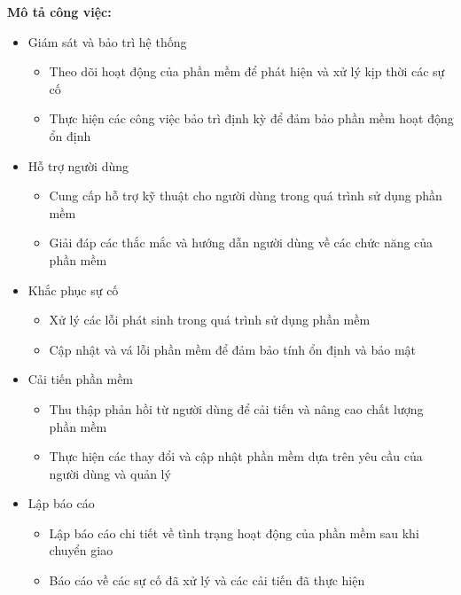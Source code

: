 {\begin{minipage}{\textwidth}
\begin{itemize}
    \end{itemize}
    \vspace{0.5cm}
    \noindent \textbf{Mô tả công việc:}
    \begin{itemize}
        \item Giám sát và bảo trì hệ thống
        \begin{itemize}
            \item Theo dõi hoạt động của phần mềm để phát hiện và xử lý kịp thời các sự cố
            \item Thực hiện các công việc bảo trì định kỳ để đảm bảo phần mềm hoạt động ổn định
        \end{itemize}
        \item Hỗ trợ người dùng
        \begin{itemize}
            \item Cung cấp hỗ trợ kỹ thuật cho người dùng trong quá trình sử dụng phần mềm
            \item Giải đáp các thắc mắc và hướng dẫn người dùng về các chức năng của phần mềm
        \end{itemize}
        \item Khắc phục sự cố
        \begin{itemize}
            \item Xử lý các lỗi phát sinh trong quá trình sử dụng phần mềm
            \item Cập nhật và vá lỗi phần mềm để đảm bảo tính ổn định và bảo mật
        \end{itemize}
        \item Cải tiến phần mềm
        \begin{itemize}
            \item Thu thập phản hồi từ người dùng để cải tiến và nâng cao chất lượng phần mềm
            \item Thực hiện các thay đổi và cập nhật phần mềm dựa trên yêu cầu của người dùng và quản lý
        \end{itemize}
        \item Lập báo cáo
        \begin{itemize}
            \item Lập báo cáo chi tiết về tình trạng hoạt động của phần mềm sau khi chuyển giao
            \item Báo cáo về các sự cố đã xử lý và các cải tiến đã thực hiện
        \end{itemize}
    \end{itemize}
    \vspace{0.5cm}

\end{minipage}}
